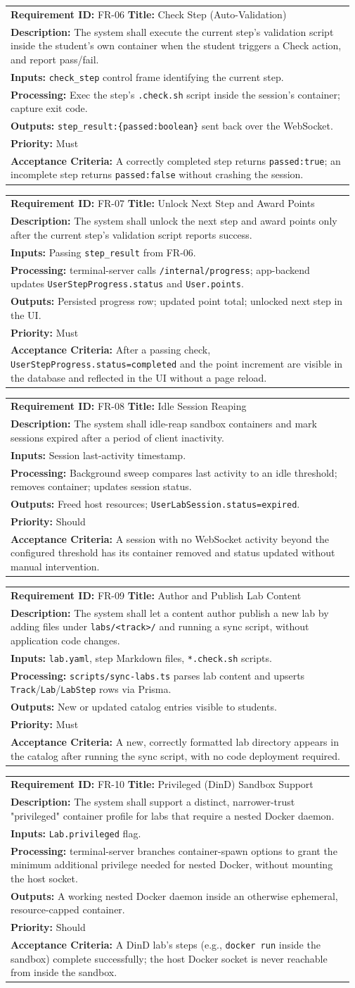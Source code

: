 \documentclass[11pt]{article}
\makeatletter
\newcommand{\frcard}[8]{%
  \par\noindent
  \begin{tabular}{@{}p{0.97\linewidth}@{}}
  \small
  \textbf{Requirement ID:} #1 \quad\textbf{Title:} #2\\[2pt]
  \textbf{Description:} #3\\[2pt]
  \textbf{Inputs:} #4\\[2pt]
  \textbf{Processing:} #5\\[2pt]
  \textbf{Outputs:} #6\\[2pt]
  \textbf{Priority:} #7\\[2pt]
  \textbf{Acceptance Criteria:} #8
  \end{tabular}
  \par\vspace{4mm}
}
\makeatother
\begin{document}
\frcard{FR-06}{Check Step (Auto-Validation)}
 {The system shall execute the current step's validation script inside
 the student's own container when the student triggers a Check action,
 and report pass/fail.}
 {\texttt{check\_step} control frame identifying the current step.}
 {Exec the step's \texttt{.check.sh} script inside the session's
 container; capture exit code.}
 {\texttt{step\_result:\{passed:boolean\}} sent back over the
 WebSocket.}
 {Must}
 {A correctly completed step returns \texttt{passed:true}; an
 incomplete step returns \texttt{passed:false} without crashing the
 session.}

\frcard{FR-07}{Unlock Next Step and Award Points}
 {The system shall unlock the next step and award points only after
 the current step's validation script reports success.}
 {Passing \texttt{step\_result} from FR-06.}
 {terminal-server calls \texttt{/internal/progress}; app-backend
 updates \texttt{UserStepProgress.status} and \texttt{User.points}.}
 {Persisted progress row; updated point total; unlocked next step in
 the UI.}
 {Must}
 {After a passing check, \texttt{UserStepProgress.status=completed}
 and the point increment are visible in the database and reflected in
 the UI without a page reload.}

\frcard{FR-08}{Idle Session Reaping}
 {The system shall idle-reap sandbox containers and mark sessions
 expired after a period of client inactivity.}
 {Session last-activity timestamp.}
 {Background sweep compares last activity to an idle threshold;
 removes container; updates session status.}
 {Freed host resources; \texttt{UserLabSession.status=expired}.}
 {Should}
 {A session with no WebSocket activity beyond the configured threshold
 has its container removed and status updated without manual
 intervention.}

\frcard{FR-09}{Author and Publish Lab Content}
 {The system shall let a content author publish a new lab by adding
 files under \texttt{labs/\textless track\textgreater/} and running a
 sync script, without application code changes.}
 {\texttt{lab.yaml}, step Markdown files, \texttt{*.check.sh} scripts.}
 {\texttt{scripts/sync-labs.ts} parses lab content and upserts
 \texttt{Track}/\texttt{Lab}/\texttt{LabStep} rows via Prisma.}
 {New or updated catalog entries visible to students.}
 {Must}
 {A new, correctly formatted lab directory appears in the catalog
 after running the sync script, with no code deployment required.}

\frcard{FR-10}{Privileged (DinD) Sandbox Support}
 {The system shall support a distinct, narrower-trust "privileged"
 container profile for labs that require a nested Docker daemon.}
 {\texttt{Lab.privileged} flag.}
 {terminal-server branches container-spawn options to grant the
 minimum additional privilege needed for nested Docker, without
 mounting the host socket.}
 {A working nested Docker daemon inside an otherwise ephemeral,
 resource-capped container.}
 {Should}
 {A DinD lab's steps (e.g., \texttt{docker run} inside the sandbox)
 complete successfully; the host Docker socket is never reachable from
 inside the sandbox.}
\end{document}
